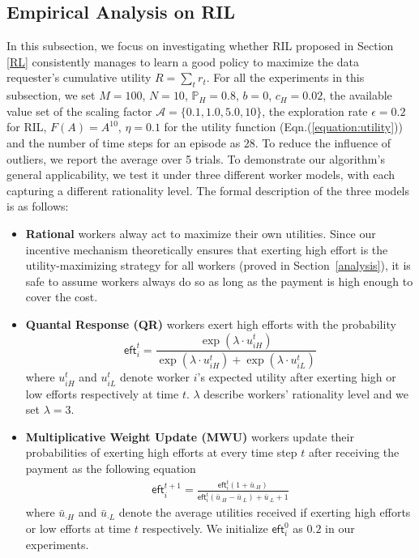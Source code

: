 \subsection{Empirical Analysis on RIL}
In this subsection, we focus on investigating whether RIL proposed in Section \ref{RL} consistently manages to learn a good policy to maximize the data requester's cumulative utility $R=\sum_t r_t$.  For all the experiments in this subsection, we set $M=100$, $N=10$, $\mathbb{P}_H=0.8$, $b=0$, $c_H=0.02$, the available value set of the scaling factor $\mathcal{A}=\{0.1,1.0,5.0,10\}$, the exploration rate $\epsilon = 0.2$ for RIL, $F(A)=A^{10}$, $\eta=0.1$ for the utility function (Eqn.(\ref{equation:utility})) and the number of time steps for an episode as $28$. To reduce the influence of outliers, we report the average over 5 trials. To demonstrate our algorithm's general applicability, we test it under three different worker models, with each capturing a different rationality level.
The formal description of the three models is as follows:
\begin{itemize}[topsep=0pt, partopsep=0pt]
\item {\bf Rational} workers alway act to maximize their own utilities. Since our incentive mechanism theoretically ensures that exerting high effort %
is the utility-maximizing strategy for all workers (proved in Section~\ref{analysis}), it is safe to assume workers always do so as long as the payment is high enough to cover the cost.
\item {\bf Quantal Response (QR)} workers \citep{mckelvey1995quantal} exert high efforts with the probability 
$$
\textsf{eft}_i^t= \frac{\exp(\lambda\cdot  u_{iH}^t)}{\exp(\lambda \cdot u_{iH}^t) + \exp (\lambda \cdot u_{iL}^t)}
$$
where $u_{iH}^t$ and $u_{iL}^t$ denote worker $i$'s expected utility after exerting high or low efforts respectively at time $t$. $\lambda$ describe workers' rationality level and we set $\lambda =3$.

\item {\bf Multiplicative Weight Update (MWU)} workers \citep{chastain2014algorithms} update their probabilities of exerting high efforts at every time step $t$ after receiving the payment as the following equation
\begin{align*}
\textsf{eft}_i^{t+1} = \frac{\textsf{eft}_i^t(1+\bar{u}_{\cdot H})}{\textsf{eft}_i^t(\bar{u}_{\cdot H} - \bar{u}_{\cdot L}) + \bar{u}_{\cdot L} + 1}
\end{align*}
where $\bar{u}_{\cdot H}$ and $\bar{u}_{\cdot L}$ denote the average utilities received if exerting high efforts or low efforts at time $t$ respectively. We initialize $\textsf{eft}_i^0$ as $0.2$ in our experiments.
\end{itemize}

